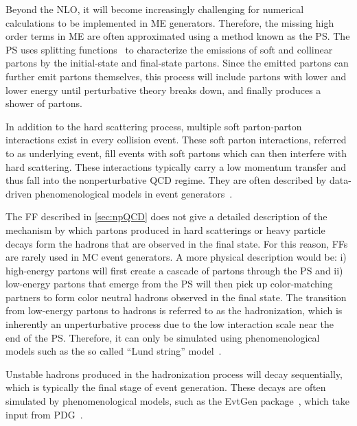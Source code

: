 Beyond the \ac{NLO}, it will become increasingly challenging for numerical calculations to be implemented in \ac{ME} generators. Therefore, the missing high order terms in \ac{ME} are often approximated using a method known as the \ac{PS}. The \ac{PS} uses splitting functions~\cite{Buckley:2011ms} to characterize the emissions of soft and collinear partons by the initial-state and final-state partons. Since the emitted partons can further emit partons themselves, this process will include partons with lower and lower energy until perturbative theory breaks down, and finally produces a shower of partons. 

In addition to the hard scattering process, multiple soft parton-parton interactions exist in every collision event. These soft parton interactions, referred to as underlying event, fill events with soft partons which can then interfere with hard scattering. These interactions typically carry a low momentum transfer and thus fall into the nonperturbative \ac{QCD} regime. They are often described by data-driven phenomenological models in event generators~\cite{Sjostrand:2014zea}.

The \ac{FF} described in \autoref{sec:npQCD} does not give a detailed description of the mechanism by which partons produced in hard scatterings or heavy particle decays form the hadrons that are observed in the final state. For this reason, \acp{FF} are rarely used in \ac{MC} event generators. A more physical description would be: i) high-energy partons will first create a cascade of partons through the \ac{PS} and ii) low-energy partons that emerge from the \ac{PS} will then pick up color-matching partners to form color neutral hadrons observed in the final state. The transition from low-energy partons to hadrons is referred to as the hadronization, which is inherently an unperturbative process due to the low interaction scale near the end of the \ac{PS}. Therefore, it can only be simulated using phenomenological models such as the so called  ``Lund string'' model~\cite{Andersson:1983ia}.

Unstable hadrons produced in the hadronization process will decay sequentially, which is typically the final stage of event generation. These decays are often simulated by phenomenological models, such as the EvtGen package~\cite{Lange:2001uf}, which take input from \ac{PDG}~\cite{ParticleDataGroup:2022pth}.